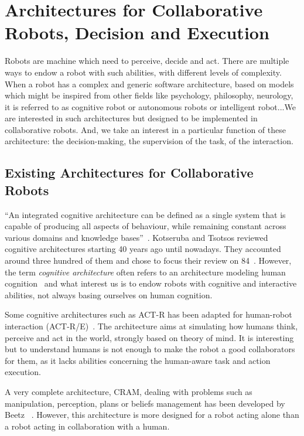 \documentclass[a4paper,11pt,twoside]{StyleThese}
\begin{document}
	\setcounter{chapter}{2} %
	\dominitoc
	\faketableofcontents
	\fi

\chapter{Architectures for Collaborative Robots, Decision and Execution}\label{chapter:chap3}
\minitoc
Robots are machine which need to perceive, decide and act. There are multiple ways to endow a robot with such abilities, with different levels of complexity. When a robot has a complex and generic software architecture, based on models which might be inspired from other fields like psychology, philosophy, neurology, it is referred to as cognitive robot or autonomous robots or intelligent robot...We are interested in such architectures but designed to be implemented in collaborative robots. And, we take an interest in a particular function of these architecture: the decision-making, the supervision of the task, of the interaction.

\section{Existing Architectures for Collaborative Robots}\label{chap3:sec:archi}
``An integrated cognitive architecture can be defined as a single system that is capable of producing all aspects of behaviour, while remaining constant across various domains and knowledge bases''~\cite[p.~104]{chong_2007_integrated}. Kotseruba and Tsotsos reviewed cognitive architectures starting 40 years ago until nowadays. They accounted around three hundred of them and chose to focus their review on 84~\cite{kotseruba_2020_40}. However, the term \emph{cognitive architecture} often refers to an architecture modeling human cognition~\cite{howes_1997_role} and what interest us is to endow robots with cognitive and interactive abilities, not always basing ourselves on human cognition.  

Some cognitive architectures such as ACT-R has been adapted for human-robot interaction (ACT-R/E)~\cite{trafton_2013_act}. The architecture aims at simulating how humans think, perceive and act in the world, strongly based on theory of mind. It is interesting but to understand humans is not enough to make the robot a good collaborators for them, as it lacks abilities concerning the human-aware task and action execution. 

A very complete architecture, CRAM, dealing with problems such as manipulation, perception, plans or beliefs management has been developed by Beetz \etal~\cite{beetz_2010_cram}. However, this architecture is more designed for a robot acting alone than a robot acting in collaboration with a human.
\end{document}
